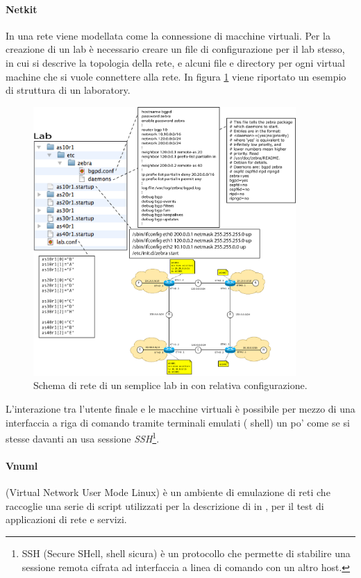 \paragraph{Netkit}In \netkit{} una rete viene modellata come la connessione di macchine virtuali. Per la creazione di un lab è necessario creare un file di configurazione per il lab stesso, in cui si descrive la topologia della rete, e alcuni file e directory per ogni virtual machine che si vuole connettere alla rete. In figura \ref{figura:netkit_lab} viene riportato un esempio di struttura di un \netkit{} laboratory.

\begin{figure}[!ht]
	\centering
	\includegraphics[width=10cm]{images/netkit_lab.png}
	\caption{Schema di rete di un semplice lab in \netkit{} con relativa configurazione.}
	\label{figura:netkit_lab}
\end{figure}

L'interazione tra l'utente finale e le macchine virtuali è possibile per mezzo di una interfaccia a riga di comando tramite terminali emulati (\linux{} shell) un po' come se si stesse davanti an usa sessione \emph{SSH}\footnote{SSH (Secure SHell, shell sicura) è un protocollo che permette di stabilire una sessione remota cifrata ad interfaccia a linea di comando con un altro host.}.


\paragraph{Vnuml}\cite{VNUMLT} (Virtual Network User Mode Linux) è un ambiente di emulazione di reti che raccoglie una serie di script utilizzati per la descrizione di \testbed{} in \xml{}, per il test di applicazioni di rete e servizi.

